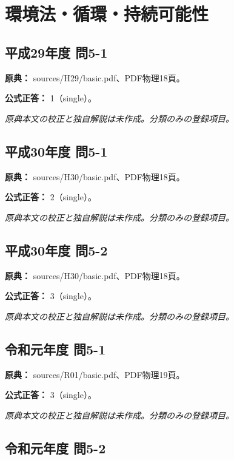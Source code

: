 \section{環境法・循環・持続可能性}

\subsection{平成29年度 問5-1}
\label{q:h29-reg-basic-5-1}

\noindent\textbf{原典：} sources/H29/basic.pdf、PDF物理18頁。

\textbf{公式正答：} 1（single）。

\par\textit{原典本文の校正と独自解説は未作成。分類のみの登録項目。}

\subsection{平成30年度 問5-1}
\label{q:h30-reg-basic-5-1}

\noindent\textbf{原典：} sources/H30/basic.pdf、PDF物理18頁。

\textbf{公式正答：} 2（single）。

\par\textit{原典本文の校正と独自解説は未作成。分類のみの登録項目。}

\subsection{平成30年度 問5-2}
\label{q:h30-reg-basic-5-2}

\noindent\textbf{原典：} sources/H30/basic.pdf、PDF物理18頁。

\textbf{公式正答：} 3（single）。

\par\textit{原典本文の校正と独自解説は未作成。分類のみの登録項目。}

\subsection{令和元年度 問5-1}
\label{q:r01-reg-basic-5-1}

\noindent\textbf{原典：} sources/R01/basic.pdf、PDF物理19頁。

\textbf{公式正答：} 3（single）。

\par\textit{原典本文の校正と独自解説は未作成。分類のみの登録項目。}

\subsection{令和元年度 問5-2}
\label{q:r01-reg-basic-5-2}

